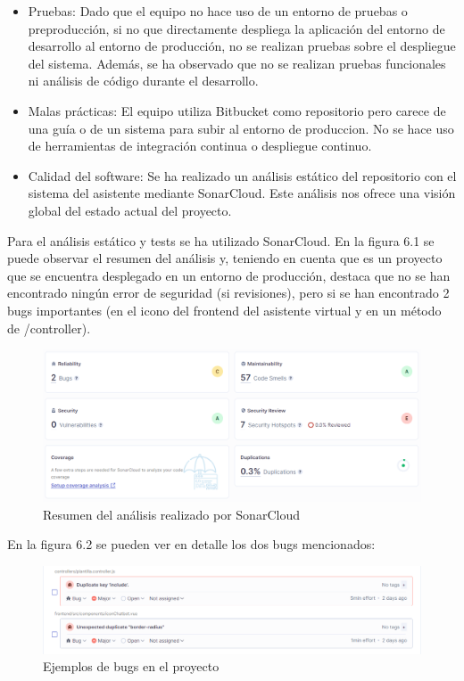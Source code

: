 \begin{itemize}
    \item Pruebas: Dado que el equipo no hace uso de un entorno de pruebas o preproducción, si no que directamente despliega la aplicación del entorno de desarrollo al entorno de producción, no se realizan pruebas sobre el despliegue del sistema. Además, se ha observado que no se realizan pruebas funcionales ni análisis de código durante el desarrollo.
    \item Malas prácticas: El equipo utiliza Bitbucket como repositorio pero carece de una guía o de un sistema para subir al entorno de produccion. No se hace uso de herramientas de integración continua o despliegue continuo.
    \item Calidad del software: Se ha realizado un análisis estático del repositorio con el sistema del asistente mediante SonarCloud. Este análisis nos ofrece una visión global del estado actual del proyecto.
\end{itemize}

Para el análisis estático y tests se ha utilizado SonarCloud. En la figura 6.1 se puede observar el resumen del análisis y, teniendo en cuenta que es un proyecto que se encuentra desplegado en un entorno de producción, destaca que no se han encontrado ningún error de seguridad (si revisiones), pero si se han encontrado 2 bugs importantes (en el icono del frontend del asistente virtual y en un método de /controller).
\newpage

\begin{figure}[h]
\includegraphics[width=\textwidth]{figures/Overview-code.png}
\caption{Resumen del análisis realizado por SonarCloud}
\label{fig:esquema}
\end{figure}



En la figura 6.2 se pueden ver en detalle los dos bugs mencionados:

\begin{figure}[h]
\includegraphics[width=\textwidth]{figures/bug-example.png}
\caption{Ejemplos de bugs en el proyecto}
\label{fig:esquema}
\end{figure}


